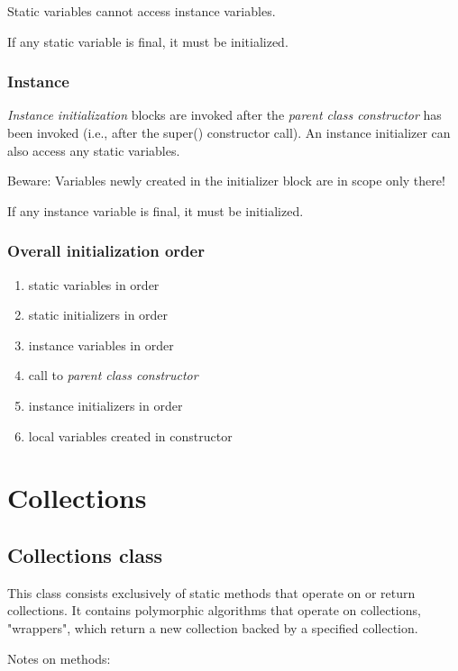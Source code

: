 \documentclass{scrartcl}
\begin{document}
    Static variables cannot access instance variables.

    If any static variable is final, it must be initialized.

\subsubsection{Instance}

    \textit{Instance initialization} blocks are invoked after the \textit{parent class constructor} has been invoked (i.e., after the super() constructor call).
    An instance initializer can also access any static variables.

    Beware: Variables newly created in the initializer block are in scope only there!

    If any instance variable is final, it must be initialized.

\subsubsection{Overall initialization order}

    \begin{enumerate}
        \item static variables in order
        \item static initializers in order
        \item instance variables in order
        \item call to \textit{parent class constructor}
        \item instance initializers in order
        \item local variables created in constructor
    \end{enumerate}

\section{Collections}

\subsection{Collections class}

    This class consists exclusively of static methods that operate on or return collections. It contains polymorphic algorithms that operate on collections, "wrappers", which return a new collection backed by a specified collection.

    Notes on methods:
\end{document}
